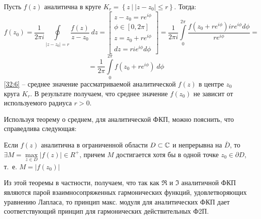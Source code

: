\documentclass[../../main.tex]{subfiles}
\begin{document}
\begin{corollary*}	
	Пусть $f(z)$ аналитична в круге $K_r = \left\lbrace z \  \big| \ |z-z_0| \le 
	r   \right\rbrace $. Тогда:
	\[   f(z_0) = \frac{1}{2 \pi i} \oint \limits_{|z-z_0| = r} 
	\frac{f(z)}{z-z_0} \ dz = \left[\begin{gathered} z-z_0 = r e^{i\phi} \\
	\phi \in [0,2\pi]  \\
	z = z_0 + r e^{i\phi} \\
	dz = r i e^{i\phi} d \phi
	\end{gathered} \right] = \frac{1}{2 \pi i} \int \limits_{0}^{2\pi} 
	\frac{f(z_0 +r e^{i\phi} ) i r e^{i\phi} d\phi}{r e^{i\phi}}  =     \]
	\begin{equation}
	\label{32:6}
	= \frac{1}{2 \pi } \int \limits_{0}^{2\pi} f(z_0 +r e^{i\phi} ) \ d \phi
	\end{equation}
	\eqref{32:6} \--- среднее значение рассматриваемой аналитической $f(z)$ в 
	центре $z_0$ круга $K_r$. В результате получаем, что среднее значение 
	$f(z_0)$ не зависит от используемого радиуса $r>0$.
\end{corollary*}
\begin{remark}
	Используя теорему о среднем, для аналитической ФКП, можно пояснить, что 
	справедлива следующая:
\end{remark}
\begin{theorem}
	Если $f(z)$ аналитична в ограниченной области $D \subset \mathbb{C}$ и непрерывна на 
	$\overline{D}$, то $\exists M = \max \limits_{z\in D} |f(z)| \in R^+$, причем 
	$M$ достигается хотя бы в одной точке $z_0 \in \partial D$, т.~е. $M = 
	|f(z_0)|$
\end{theorem}		
Из этой теоремы в частности, получаем, что так как $\Re$ и $\Im$ аналитичной 
ФКП 
являются парой взаимносопряженных гармонических функций, удовлетворяющих 
уравнению Лапласа, то принцип макс. модуля для аналитических ФКП дает 
соответствующий принцип для гармонических действительных Ф2П.
	
\end{document}
